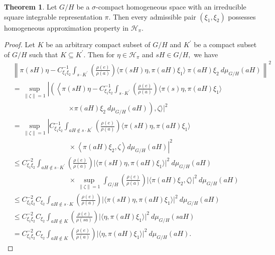 \documentclass[11pt,reqno]{amsart}
\numberwithin{equation}{section}
\theoremstyle{definition}
\newtheorem{thm}{\sc Theorem}[section]
\begin{document}
\begin{thm}
Let $G/H$ be a $\sigma $-compact homogeneous space with  an irreducible square integrable representation $\pi$. Then every admissible pair $(\xi_1,\xi_2)$ possesses homogeneous approximation property in $\mathcal{H}_{\pi}$.  
\end{thm}
\begin{proof}
Let $K$ be an arbitrary compact subset of $G/H$ and $K^{'}$ be a compact subset of $G/H$ such that $K\subseteq K^{'}$. Then for $\eta \in \mathcal{H}_{\pi}$ and $sH \in G/H,$ we have
\begin{align*}
&\left\|\pi(sH)\eta - C_{\xi_1\xi_2}^{-1}\int_{s\cdot K^{'}}\left(\frac{\rho(e)}{\rho(a)}\right)\langle \pi(sH)\eta, \pi(aH)\xi_1 \rangle\ \pi(aH)\xi_2\  d\mu_{G/H}(aH)\right\|^2\\
&=\sup\limits_{\|\zeta\|=1}\left|\left(\left\langle  \pi(sH)\eta - C_{\xi_1\xi_2}^{-1}\int_{s\cdot K^{'}}\left(\frac{\rho(e)}{\rho(a)}\right)\langle \pi(s)\eta,
\pi(aH)\xi_1 \rangle\right.\right. \right.\\
&\qquad\qquad \qquad \qquad \left.\times \pi(aH)\xi_2\ d\mu_{G/H}(aH)\right) , \left.\zeta\rangle  \right|^2\\
&=\sup\limits_{\|\zeta\|=1}\left|  C_{\xi_1\xi_2}^{-1} \int_{aH \notin s\cdot K^{'}}\left(\frac{\rho(e)}{\rho(a)}\right)\langle \pi(sH)\eta, \pi(aH)\xi_1 \rangle\right. \\
&\qquad \qquad \qquad \qquad \times \left. \left\langle\pi(aH)\xi_2,\zeta \right\rangle d\mu_{G/H}(aH) \right|^{2}\\
&\leq C_{\xi_1\xi_2}^{-2}\int_{aH \notin s\cdot K^{'}}\left(\frac{\rho(e)}{\rho(a)}\right)\big|\langle \pi(sH)\eta, \pi(aH)\xi_1 \rangle\big|^{2}\ d\mu_{G/H}(aH)\\
&\qquad \qquad \qquad \qquad\times \sup\limits_{\|\zeta\| = 1}\int_{G/H}\left(\frac{\rho(e)}{\rho(a)}\right)\big|\langle\pi(aH)\xi_2,\zeta \rangle\big|^2\ d\mu_{G/H}(aH)\\
&\leq C_{\xi_1\xi_2}^{-2}C_{\xi_2}\int_{aH \notin s\cdot K}\left(\frac{\rho(e)}{\rho(a)}\right)\big|\langle \pi(sH)\eta, \pi(aH)\xi_1 \rangle\big|^{2}\ d\mu_{G/H}(aH)\\
&\leq C_{\xi_1\xi_2}^{-2}C_{\xi_2}\int_{aH \notin  K}\left(\frac{\rho(e)}{\rho(sa)}\right)\big|\langle \eta, \pi(aH)\xi_1 \rangle\big|^{2}\ d\mu_{G/H}(saH)\\
&= C_{\xi_1\xi_2}^{-2}C_{\xi_2}\int_{aH \notin K}\left(\frac{\rho(e)}{\rho(a)}\right)\big|\langle \eta, \pi(aH)\xi_1 \rangle\big|^{2}\ d\mu_{G/H}(aH).

\end{align*}
\end{proof}
\end{document}
